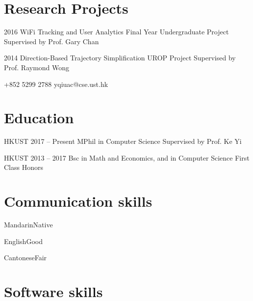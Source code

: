 \documentclass{tccv}
\begin{document}
\section{Research Projects}

\begin{yearlist}

\item{2016}
     {WiFi Tracking and User Analytics}
     {Final Year Undergraduate Project \newline Supervised by Prof. Gary Chan}

\item{2014}
     {Direction-Based Trajectory \newline Simplification}
     {UROP Project \newline Supervised by Prof. Raymond Wong}

\end{yearlist}

    {+852 5299 2788}
    {yqiuac@cse.ust.hk}

\section{Education}

\begin{yearlist}

\item[HKUST]{2017 -- Present}
     {MPhil in Computer Science}
     {Supervised by Prof. Ke Yi}

\item[HKUST]{2013 -- 2017}
     {Bsc in Math and Economics, and in Computer Science}
     {First Class Honors}

\end{yearlist}

\section{Communication skills}

\begin{factlist}
\item{Mandarin}{Native}
\item{English}{Good}
\item{Cantonese}{Fair}
\end{factlist}

\section{Software skills}
\end{document}
